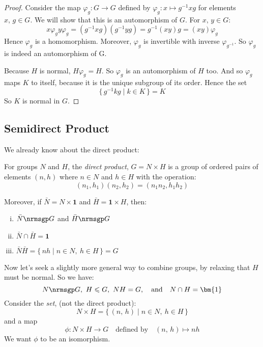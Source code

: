 \begin{proof}
    Consider the map \(\varphi_g:G \to G\) defined by \(\varphi_g:x \mapsto g^{-1}xg\) for elements \(x,\,g \in G\).
    We will show that this is an automorphism of \(G\).
    For \(x,\,y \in G\):
    \[x\varphi_g y\varphi_g = (g^{-1}xg)(g^{-1}yg) = g^{-1}(xy)g = (xy)\varphi_g\]
    Hence \(\varphi_g\) is a homomorphism.
    Moreover, \(\varphi_g\) is invertible with inverse \(\varphi_{g^{-1}}\).
    So \(\varphi_g\) is indeed an automorphism of G.

    Because \(H\) is normal, \(H\varphi_g = H\).
    So \(\varphi_g\) is an automorphism of \(H\) too.
    And so \(\varphi_g\) maps \(K\) to itself, because it is the unique subgroup of its order.
    Hence the set
    \[\{\,g^{-1}kg \mid k \in K\,\} = K\]
    So \(K\) is normal in \(G\).
\end{proof}

\subsection{Semidirect Product}
We already know about the direct product:

\begin{definition}
    For groups \(N\) and \(H\), the \emph{direct product}, \(G = N\times H\) is a group of ordered pairs of elements
    \((n, h)\) where \(n \in N\) and \(h \in H\) with the operation:
    \[(n_1, h_1)(n_2, h_2) = (n_1n_2, h_1h_2)\]

    Moreover, if \(\bar{N} = N \times \bm{1}\) and \(\bar{H} = \bm{1} \times H\), then:
    \begin{enumerate}[(i)]
        \item \(\bar{N} \nrmsgp G\) and \(\bar{H} \nrmsgp G\)
        \item \(\bar{N} \cap \bar{H} = \bm{1}\)
        \item \(\bar{N}\bar{H} = \{\,nh \mid n \in N,\ h \in H\,\} = G\)
    \end{enumerate}
\end{definition}

Now let's seek a slightly more general way to combine groups, by relaxing that \(H\) must be normal.
So we have:
\[N \nrmsgp G,\ H \leqslant G,\ NH = G, \quad \text{and} \quad N \cap H = \bm{1}\]
Consider the \emph{set}, (not the direct product):
\[N \times H = \{\,(n,\,h) \mid n \in N,\ h \in H\,\}\]
and a map
\[\phi:N \times H \to G \quad \text{defined by} \quad (n,\, h) \mapsto nh\]
We want \(\phi\) to be an isomorphism.

